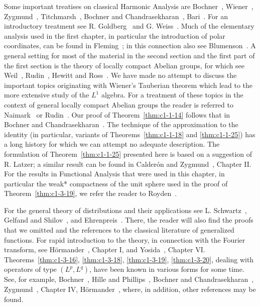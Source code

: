 Some important treatises on classical Harmonic Analysis are
Bochner~\cite{Bochner3}, Wiener~\cite{Wiener1}, Zygmund~\cite{Zygmund1},
Titchmarsh~\cite{Titchmarsh2}, Bochner and
Chandrasekharan~\cite{BochnerChandrasekharan1}, Bari~\cite{Bari1}. For an
introductory treatment see R. Goldberg~\cite{Goldberg1} and
G. Weiss~\cite{Weiss3}. Much of the elementary analysis used in the first
chapter, in particular the introduction of polar coordinates, can be found in
Fleming~\cite{Fleming1}; in this connection also see
Blumenson~\cite{Blumenson1}. A general setting for most of the material in the
second section and the first part of the first section is the theory of locally
compact Abelian groups, for which see Weil~\cite{Weil1}, Rudin~\cite{Rudin1},
Hewitt and Ross~\cite{HewittRoss1}. We have made no attempt to discuss the
important topics originating with Wiener's Tauberian theorem which lead to the
more extensive study of the $L^{1}$ algebra. For a treatment of these topics in
the context of general locally compact Abelian groups the reader is referred
to Naimark~\cite{Naimark1} or Rudin~\cite{Rudin1}. Our proof of
Theorem~\ref{thm:c1-1-14} follows that in Bochner and
Chandrasekharan~\cite{BochnerChandrasekharan1}. The technique of the
approximation to the identity (in particular, variants of
Theorems~\ref{thm:c1-1-18} and \ref{thm:c1-1-25}) has a long history for which
we can attempt no adequate description. The formulation of
Theorem~\ref{thm:c1-1-25} presented here is based on a suggestion of R. Latzer;
a similar result can be found in Calder\'on and
Zygmund~\cite{CalderonZygmund3}, Chapter II. For the results in Functional
Analysis that were used in this chapter, in particular the weak* compactness
of the unit sphere used in the proof of Theorem~\ref{thm:c1-3-19}, we refer the
reader to Royden~\cite{Royden1}.

For the general theory of distributions and their applications see
L. Schwartz~\cite{Schwartz1}, Gelfand and Shilov~\cite{GelfandShilov1}, and
Ehrenpreis~\cite{Ehrenpreis1}. There, the reader will also find the proofs
that we omitted and the references to the classical literature of generalized
functions. For rapid introduction to the theory, in connection with the Fourier
transform, see H\"ormander~\cite{Hormander2}, Chapter I, and
Yosida~\cite{Yosida1}, Chapter VI. Theorems~\ref{thm:c1-3-16},
\ref{thm:c1-3-18}, \ref{thm:c1-3-19}, \ref{thm:c1-3-20}, dealing with operators
of type $(L^{p}, L^{q})$, have been known in various forms for some time. See,
for example, Bochner~\cite{Bochner9}, Hille and
Phillips~\cite{HillePhillips1}, Bochner and
Chandrasekharan~\cite{BochnerChandrasekharan1}, Zygmund~\cite{Zygmund1},
Chapter IV, H\"ormander~\cite{Hormander1}, where, in addition, other
references may be found.

